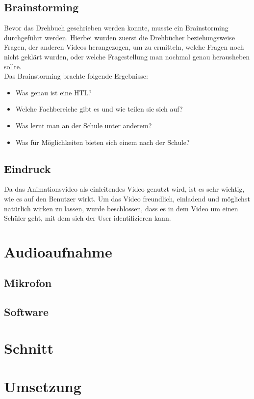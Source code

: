 \subsection{Brainstorming}
Bevor das Drehbuch geschrieben werden konnte, musste ein Brainstorming durchgeführt werden. Hierbei wurden zuerst die Drehbücher beziehungsweise Fragen, der anderen Videos herangezogen, um zu ermitteln, welche Fragen noch nicht geklärt wurden, oder welche Fragestellung man nochmal genau herausheben sollte.
\leavevmode \\
Das Brainstorming brachte folgende Ergebnisse:
\begin{itemize}
\item Was genau ist eine HTL?
\item Welche Fachbereiche gibt es und wie teilen sie sich auf?
\item Was lernt man an der Schule unter anderem?
\item Was für Möglichkeiten bieten sich einem nach der Schule?
\end{itemize}

\subsection{Eindruck}
Da das Animationsvideo als einleitendes Video genutzt wird, ist es sehr wichtig, wie es auf den Benutzer wirkt. Um das Video freundlich, einladend und möglichst natürlich wirken zu lassen, wurde beschlossen, dass es in dem Video um einen Schüler geht, mit dem sich der User identifizieren kann.

\section{Audioaufnahme}

\subsection{Mikrofon}

\subsection{Software}

\section{Schnitt}

\section{Umsetzung}
